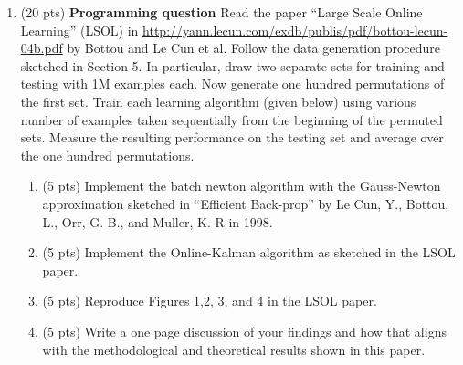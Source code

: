 \documentclass[11pt]{article}
\newcommand{\bi}{\begin{enumerate}}
\newcommand{\ib}{\end{enumerate}}
\newcommand{\p}{\item}
\begin{document}
\begin{enumerate}
\item (20 pts) \textbf{Programming question} Read the paper ``Large Scale Online Learning'' (LSOL) in \url{http://yann.lecun.com/exdb/publis/pdf/bottou-lecun-04b.pdf} by Bottou and Le Cun et al. Follow the data generation procedure sketched in Section 5. In particular, draw two separate sets for training and testing with 1M examples each. Now generate one hundred permutations of the first set. Train each learning algorithm (given below)  using various number of examples taken sequentially from the beginning of the permuted sets. Measure the resulting performance  on the testing set and average over the one hundred permutations.
\bi
\p (5 pts) Implement the batch newton algorithm  with the Gauss-Newton approximation sketched in ``Efficient Back-prop'' by Le Cun, Y., Bottou, L., Orr, G. B., and Muller, K.-R in 1998.
\p (5 pts) Implement the Online-Kalman algorithm as sketched in the LSOL paper.
\p (5 pts) Reproduce Figures 1,2, 3, and 4 in the LSOL paper. 
\p (5 pts) Write a one page discussion of your findings and how that aligns with the methodological and theoretical results shown in this paper.
\ib
\end{enumerate}
\end{document}
